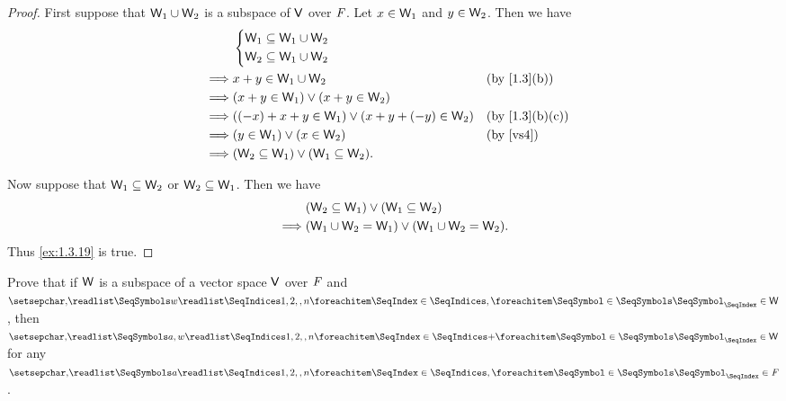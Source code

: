 \begin{proof}
  First suppose that \(\mathsf{W}_1 \cup \mathsf{W}_2\) is a subspace of \(\mathsf{V}\) over \(\mathit{F}\).
  Let \(x \in \mathsf{W}_1\) and \(y \in \mathsf{W}_2\).
  Then we have
  \begin{align*}
             & \begin{dcases}
      \W_1 \subseteq \W_1 \cup \W_2 \\
      \W_2 \subseteq \W_1 \cup \W_2
    \end{dcases}                                                             \\
    \implies & x + y \in \W_1 \cup \W_2                             &  & \text{(by \cref{1.3}(b))}    \\
    \implies & (x + y \in \W_1) \lor (x + y \in \W_2)                                                 \\
    \implies & ((-x) + x + y \in \W_1) \lor (x + y + (-y) \in \W_2) &  & \text{(by \cref{1.3}(b)(c))} \\
    \implies & (y \in \W_1) \lor (x \in \W_2)                       &  & \text{(by \ref{vs4})}        \\
    \implies & (\W_2 \subseteq \W_1) \lor (\W_1 \subseteq \W_2).
  \end{align*}

  Now suppose that \(\mathsf{W}_1 \subseteq \mathsf{W}_2\) or \(\mathsf{W}_2 \subseteq \mathsf{W}_1\).
  Then we have
  \begin{align*}
             & (\mathsf{W}_2 \subseteq \mathsf{W}_1) \lor (\mathsf{W}_1 \subseteq \mathsf{W}_2)      \\
    \implies & (\mathsf{W}_1 \cup \mathsf{W}_2 = \mathsf{W}_1) \lor (\mathsf{W}_1 \cup \mathsf{W}_2 = \mathsf{W}_2).
  \end{align*}
  Thus \cref{ex:1.3.19} is true.
\end{proof}

\begin{ex}\label{ex:1.3.20}
  Prove that if \(\mathsf{W}\) is a subspace of a vector space \(\mathsf{V}\) over \(\mathit{F}\) and \(\seq{w}{1,2,,n} \in \W\), then \(\seq[+]{a,w}{1,2,,n} \in \W\) for any \(\seq{a}{1,2,,n} \in \F\).
\end{ex}

